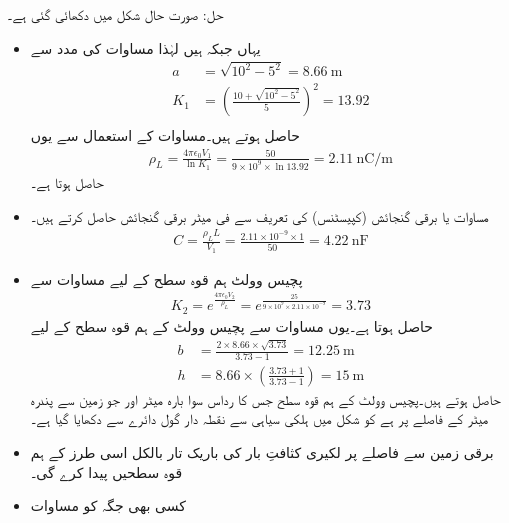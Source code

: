حل: صورت حال شکل  میں دکھائی گئی ہے۔
\begin{itemize}
\item
یہاں  جبکہ  ہیں لہٰذا مساوات  کی مدد سے
\begin{align*}
a&=\sqrt{10^2-5^2}=\SI{8.66}{\meter}\\
K_1&=\left(\frac{10+\sqrt{10^2-5^2}}{5}\right)^2=13.92\\
\end{align*}
حاصل ہوتے ہیں۔مساوات  کے استعمال سے یوں
\begin{align*}
\rho_L=\frac{4\pi\epsilon_0 V_1}{\ln K_1}=\frac{50}{9 \times 10^9 \times \ln 13.92}=\SI{2.11}{\nano \coulomb \per \meter}
\end{align*}
حاصل ہوتا ہے۔
\item
مساوات  یا برقی گنجائش (کپیسٹنس) کی تعریف سے فی میٹر برقی گنجائش حاصل کرتے ہیں۔
\begin{align*}
C=\frac{\rho_L L}{V_1} =\frac{2.11 \times 10^{-9} \times 1}{50}=\SI{4.22}{\nano \farad }
\end{align*}
\item
پچیس وولٹ ہم قوہ سطح کے لیے مساوات  سے 
\begin{align*}
K_2=e^{\frac{4\pi\epsilon_0 V_2}{\rho_L}}=e^{\frac{25}{9\times 10^9 \times 2.11 \times 10^{-9}}}=3.73
\end{align*}
حاصل ہوتا ہے۔یوں مساوات  سے پچیس وولٹ کے ہم قوہ سطح کے لیے
\begin{align*}
b&=\frac{2\times 8.66 \times \sqrt{3.73}}{3.73-1}=\SI{12.25}{\meter}\\
h&=8.66 \times \left(\frac{3.73+1}{3.73-1} \right)=\SI{15}{\meter}
\end{align*}
حاصل ہوتے ہیں۔پچیس وولٹ کے ہم قوہ سطح جس کا رداس سوا بارہ میٹر اور جو زمین سے پندرہ میٹر کے فاصلے پر ہے  کو شکل میں ہلکی سیاہی سے نقطہ دار گول دائرے سے دکھایا گیا ہے۔
\item
برقی زمین سے   فاصلے پر  لکیری کثافتِ بار کی باریک تار بالکل اسی طرز کے ہم قوہ سطحیں پیدا کرے گی۔ 
\item
کسی بھی جگہ  کو مساوات 


\end{itemize}
